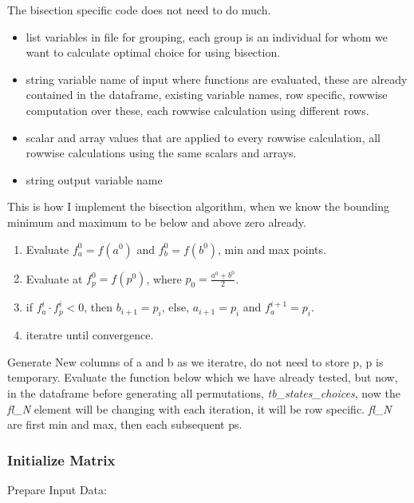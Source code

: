\documentclass[
]{book}
\providecommand{\tightlist}{%
  \setlength{\itemsep}{0pt}\setlength{\parskip}{0pt}}
\begin{document}
The bisection specific code does not need to do much.

\begin{itemize}
\tightlist
\item
  list variables in file for grouping, each group is an individual for whom we want to calculate optimal choice for using bisection.
\item
  string variable name of input where functions are evaluated, these are already contained in the dataframe, existing variable names, row specific, rowwise computation over these, each rowwise calculation using different rows.
\item
  scalar and array values that are applied to every rowwise calculation, all rowwise calculations using the same scalars and arrays.
\item
  string output variable name
\end{itemize}

This is how I implement the bisection algorithm, when we know the bounding minimum and maximum to be below and above zero already.

\begin{enumerate}
\def\labelenumi{\arabic{enumi}.}
\tightlist
\item
  Evaluate \(f^0_a = f(a^0)\) and \(f^0_b = f(b^0)\), min and max points.
\item
  Evaluate at \(f^0_p = f(p^0)\), where \(p_0 = \frac{a^0+b^0}{2}\).
\item
  if \(f^i_a \cdot f^i_p < 0\), then \(b_{i+1} = p_i\), else, \(a_{i+1} = p_i\) and \(f^{i+1}_a = p_i\).
\item
  iteratre until convergence.
\end{enumerate}

Generate New columns of a and b as we iteratre, do not need to store p, p is temporary. Evaluate the function below which we have already tested, but now, in the dataframe before generating all permutations, \emph{tb\_states\_choices}, now the \emph{fl\_N} element will be changing with each iteration, it will be row specific. \emph{fl\_N} are first min and max, then each subsequent ps.

\hypertarget{initialize-matrix}{%
\subsubsection{Initialize Matrix}\label{initialize-matrix}}

Prepare Input Data:
\end{document}
